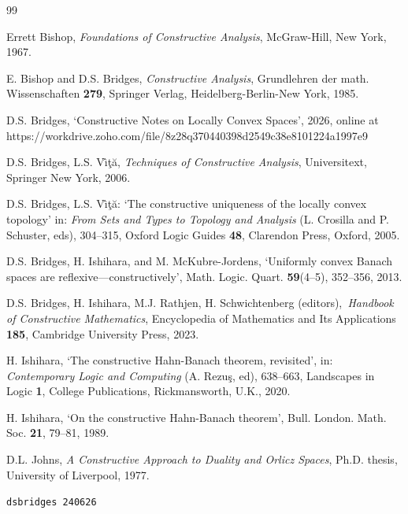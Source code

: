 \documentclass[11pt]{article}%
\begin{document}
\begin{thebibliography}{99}                                                                                               %


Errett Bishop, \emph{Foundations of Constructive Analysis},
McGraw-Hill, New York, 1967.

E. Bishop and D.S. Bridges, \emph{Constructive Analysis},
Grundlehren der math. Wissenschaften \textbf{279}, Springer Verlag,
Heidelberg-Berlin-New York, 1985.

D.S. Bridges, `Constructive Notes on Locally Convex
Spaces', 2026, online at
{\small https://workdrive.zoho.com/file/8z28q370440398d2549c38e8101224a1997e9}

D.S. Bridges, L.S. V\^{\i}\c{t}\u{a}, \emph{Techniques of
Constructive Analysis}, Universitext, Springer New York, 2006.

D.S. Bridges, L.S. V\^{\i}\c{t}\u{a}: `The constructive
uniqueness of the locally convex topology' in: \emph{From Sets and Types to
Topology and Analysis} (L. Crosilla and P. Schuster, eds), 304--315, Oxford
Logic Guides \textbf{48}, Clarendon Press, Oxford, 2005.

D.S. Bridges, H. Ishihara, and M. McKubre-Jordens, `Uniformly
convex Banach spaces are reflexive---constructively', Math. Logic. Quart.
\textbf{59}(4--5), 352--356, 2013.

D.S. Bridges, H. Ishihara, M.J. Rathjen, H. Schwichtenberg
(editors),\emph{\ Handbook of Constructive Mathematics}, Encyclopedia of
Mathematics and Its Applications \textbf{185}, Cambridge University Press, 2023.

H. Ishihara, `The constructive Hahn-Banach theorem,
revisited', in: \emph{Contemporary Logic and Computing }(A. Rezu\c{s}, ed),
638--663, Landscapes in Logic \textbf{1}, College Publications, Rickmansworth,
U.K., 2020.

H. Ishihara, `On the constructive Hahn-Banach theorem',
Bull. London. Math. Soc. \textbf{21}, 79--81, 1989.

D.L. Johns, \emph{A Constructive Approach to Duality and
Orlicz Spaces}, Ph.D. thesis, University of Liverpool, 1977.
\end{thebibliography}

\vfill


\begin{flushright}
\texttt{{\small dsbridges 240626}}
\end{flushright}
\end{document}
